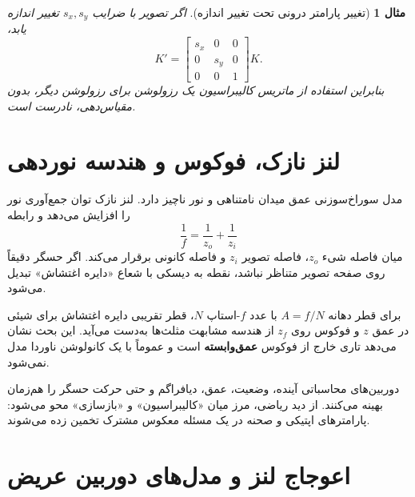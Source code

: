 \documentclass[12pt,openany,oneside]{book}
\newtheorem{example}{مثال}[chapter]
\begin{document}
\begin{example}[تغییر پارامتر درونی تحت تغییر اندازه]
اگر تصویر با ضرایب \(s_x,s_y\) تغییر اندازه یابد،
\begin{equation}
K'=\begin{bmatrix}s_x&0&0\\0&s_y&0\\0&0&1\end{bmatrix}K.
\end{equation}
بنابراین استفاده از ماتریس کالیبراسیون یک رزولوشن برای رزولوشن دیگر، بدون مقیاس‌دهی، نادرست است.
\end{example}

\section{لنز نازک، فوکوس و هندسه نوردهی}

مدل سوراخ‌سوزنی عمق میدان نامتناهی و نور ناچیز دارد. لنز نازک توان جمع‌آوری نور را افزایش می‌دهد و رابطه
\begin{equation}
\frac{1}{f}=\frac{1}{z_o}+\frac{1}{z_i}
\label{eq:thin-lens}
\end{equation}
میان فاصله شیء \(z_o\)، فاصله تصویر \(z_i\) و فاصله کانونی برقرار می‌کند. اگر حسگر دقیقاً روی صفحه تصویر متناظر نباشد،
نقطه به دیسکی با شعاع «دایره اغتشاش» تبدیل می‌شود.

برای قطر دهانه \(A=f/N\) با عدد \(f\)-استاپ \(N\)، قطر تقریبی دایره اغتشاش برای شیئی در عمق \(z\) و فوکوس روی \(z_f\) از هندسه مشابهت مثلث‌ها به‌دست می‌آید. این بحث نشان می‌دهد تاری خارج از فوکوس
\textbf{عمق‌وابسته} است و عموماً با یک کانولوشن ناوردا مدل نمی‌شود.

\begin{futurebox}
دوربین‌های محاسباتی آینده، وضعیت، عمق، دیافراگم و حتی حرکت حسگر را هم‌زمان بهینه می‌کنند. از دید ریاضی، مرز میان
«کالیبراسیون» و «بازسازی» محو می‌شود: پارامترهای اپتیکی و صحنه در یک مسئله معکوس مشترک تخمین زده می‌شوند.
\end{futurebox}

\section{اعوجاج لنز و مدل‌های دوربین عریض}
\end{document}
